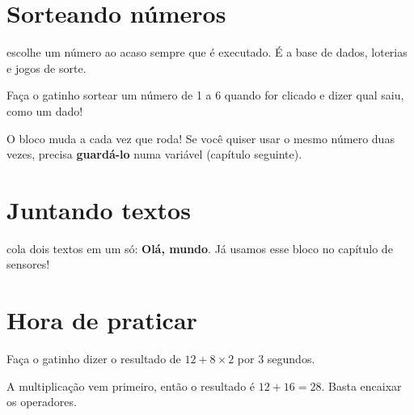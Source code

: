 \section{Sorteando números}

 escolhe um número ao acaso sempre que é executado. É a base de dados, loterias e jogos de sorte.

\begin{missao}
Faça o gatinho sortear um número de 1 a 6 quando for clicado e dizer qual saiu, como um dado!
\end{missao}

\begin{codigo}
\begin{pilha}
\end{pilha}
\end{codigo}

\begin{cuidado}
O bloco  muda a cada vez que roda! Se você quiser usar o mesmo número duas vezes, precisa \textbf{guardá-lo} numa variável (capítulo seguinte).
\end{cuidado}

\section{Juntando textos}

 cola dois textos em um só: \textbf{Olá, mundo}. Já usamos esse bloco no capítulo de sensores!

\section{Hora de praticar}

\begin{exercicio}
Faça o gatinho dizer o resultado de $12 + 8 \times 2$ por 3 segundos.
\end{exercicio}

\begin{solucao}
A multiplicação vem primeiro, então o resultado é $12 + 16 = 28$. Basta encaixar os operadores.
\begin{pilha}
\end{pilha}
\end{solucao}

